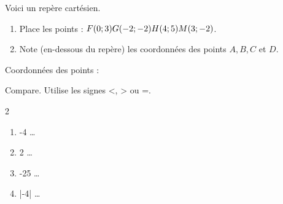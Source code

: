 \documentclass[parskip=half-,DIV=12,twoside=semi, 12pt]{scrartcl}
\begin{document}
\begin{appliquer}[points=4]
    Voici un repère cartésien.
    \begin{enumerate}
        \item Place les points :
              \(\hfil F(0;3)\hfil G(-2;-2)\hfil H(4;5) \hfil M(3;-2)\).
        \item Note (en-dessous du repère) les coordonnées des points $A, B, C$ et $D$.
    \end{enumerate}
    \begin{center}
    \end{center}
    Coordonnées des points :
    \vspace{2cm}
\end{appliquer}
\begin{appliquer}[points=2]
    Compare. Utilise les signes <, > ou =.
    \begin{multicols}{2}
        \begin{enumerate} [itemsep=0.5cm, label=\ ]
            \item -4 \quad\ldots{}
            \item 2 \quad\ldots{}
            \item -25 \quad\ldots{}
            \item |-4| \quad\ldots{}
        \end{enumerate}
    \end{multicols}
\end{appliquer}
\newpage
\end{document}
